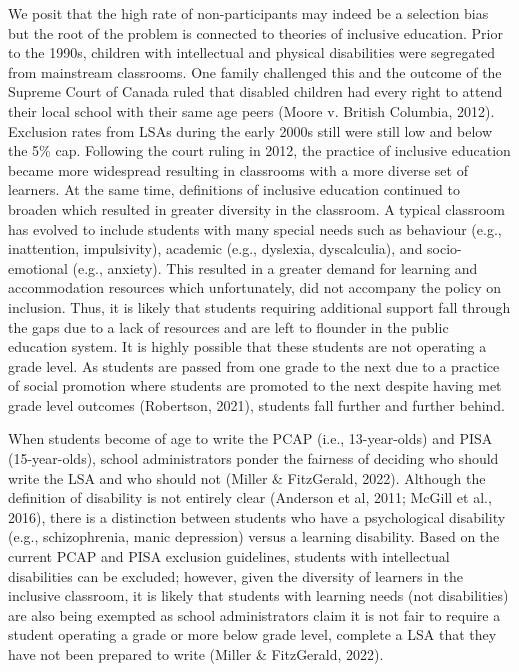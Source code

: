 \documentclass[
]{book}
\begin{document}
We posit that the high rate of non-participants may indeed be a selection bias but the root of the problem is connected to theories of inclusive education. Prior to the 1990s, children with intellectual and physical disabilities were segregated from mainstream classrooms. One family challenged this and the outcome of the Supreme Court of Canada ruled that disabled children had every right to attend their local school with their same age peers (Moore v. British Columbia, 2012). Exclusion rates from LSAs during the early 2000s still were still low and below the 5\% cap. Following the court ruling in 2012, the practice of inclusive education became more widespread resulting in classrooms with a more diverse set of learners. At the same time, definitions of inclusive education continued to broaden which resulted in greater diversity in the classroom. A typical classroom has evolved to include students with many special needs such as behaviour (e.g., inattention, impulsivity), academic (e.g., dyslexia, dyscalculia), and socio-emotional (e.g., anxiety). This resulted in a greater demand for learning and accommodation resources which unfortunately, did not accompany the policy on inclusion. Thus, it is likely that students requiring additional support fall through the gaps due to a lack of resources and are left to flounder in the public education system. It is highly possible that these students are not operating a grade level. As students are passed from one grade to the next due to a practice of social promotion where students are promoted to the next despite having met grade level outcomes (Robertson, 2021), students fall further and further behind.

When students become of age to write the PCAP (i.e., 13-year-olds) and PISA (15-year-olds), school administrators ponder the fairness of deciding who should write the LSA and who should not (Miller \& FitzGerald, 2022). Although the definition of disability is not entirely clear (Anderson et al, 2011; McGill et al., 2016), there is a distinction between students who have a psychological disability (e.g., schizophrenia, manic depression) versus a learning disability. Based on the current PCAP and PISA exclusion guidelines, students with intellectual disabilities can be excluded; however, given the diversity of learners in the inclusive classroom, it is likely that students with learning needs (not disabilities) are also being exempted as school administrators claim it is not fair to require a student operating a grade or more below grade level, complete a LSA that they have not been prepared to write (Miller \& FitzGerald, 2022).
\end{document}
